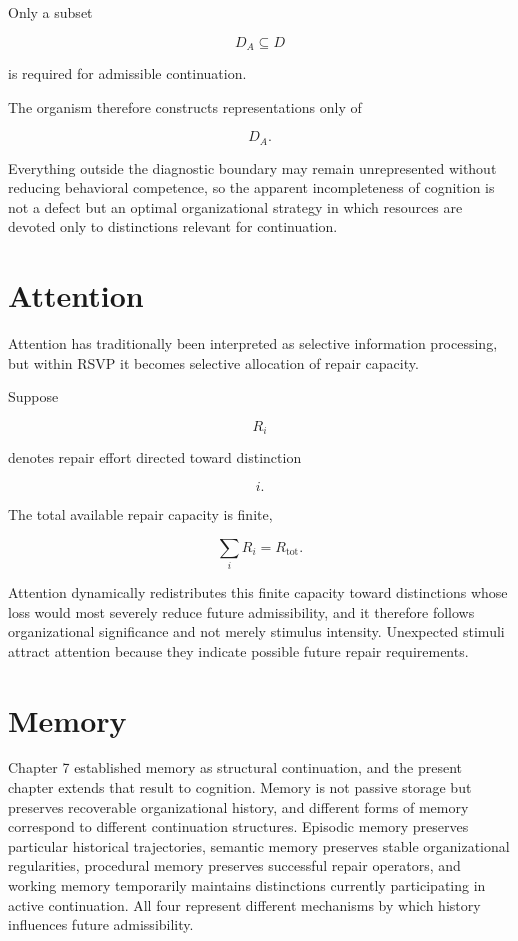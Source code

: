\documentclass[11pt,oneside]{book}
\numberwithin{equation}{chapter}
\theoremstyle{definition}
\theoremstyle{plain}
\begin{document}
Only a subset

\[
D_A \subseteq D
\]

is required for admissible continuation.

The organism therefore constructs representations only of

\[
D_A.
\]

Everything outside the diagnostic boundary may remain unrepresented without reducing behavioral competence, so the apparent incompleteness of cognition is not a defect but an optimal organizational strategy in which resources are devoted only to distinctions relevant for continuation.

\section{Attention}

Attention has traditionally been interpreted as selective information processing, but within RSVP it becomes selective allocation of repair capacity.

Suppose

\[
R_i
\]

denotes repair effort directed toward distinction

\[
i.
\]

The total available repair capacity is finite,

\[
\sum_i R_i = R_{\mathrm{tot}}.
\]

Attention dynamically redistributes this finite capacity toward distinctions whose loss would most severely reduce future admissibility, and it therefore follows organizational significance and not merely stimulus intensity. Unexpected stimuli attract attention because they indicate possible future repair requirements.

\section{Memory}

Chapter 7 established memory as structural continuation, and the present chapter extends that result to cognition. Memory is not passive storage but preserves recoverable organizational history, and different forms of memory correspond to different continuation structures. Episodic memory preserves particular historical trajectories, semantic memory preserves stable organizational regularities, procedural memory preserves successful repair operators, and working memory temporarily maintains distinctions currently participating in active continuation. All four represent different mechanisms by which history influences future admissibility.
\end{document}
